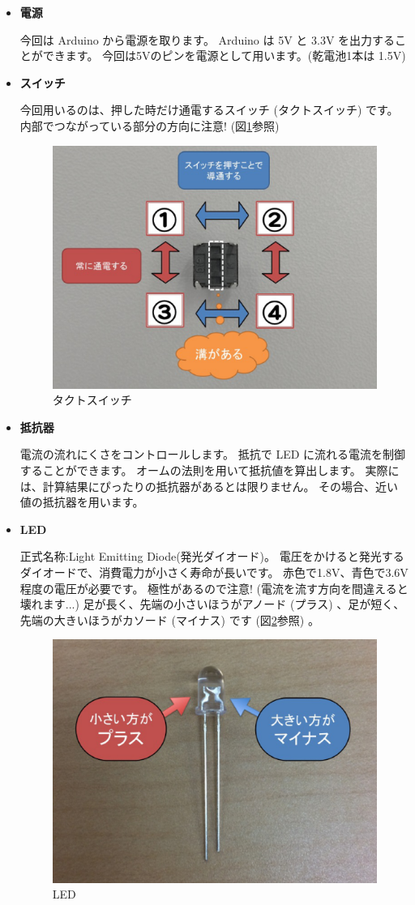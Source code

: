 \documentclass[11pt,a4paper]{jarticle}
\begin{document}
\begin{itemize}
 \item \textbf{電源}
       
       今回は Arduino から電源を取ります。
       Arduino は 5V と 3.3V を出力することができます。
       今回は5Vのピンを電源として用います。(乾電池1本は 1.5V)

 \item \textbf{スイッチ}

       今回用いるのは、押した時だけ通電するスイッチ (タクトスイッチ) です。
       内部でつながっている部分の方向に注意! (図\ref{figure:tact_switch}参照) 
       
\begin{figure}[htb]
 \centering
  \includegraphics[width=0.55\columnwidth]{img/tact_switch.eps}
  \caption{タクトスイッチ}
  \label{figure:tact_switch}
\end{figure}

 \item \textbf{抵抗器}

       電流の流れにくさをコントロールします。
       抵抗で LED に流れる電流を制御することができます。
       オームの法則を用いて抵抗値を算出します。
       実際には、計算結果にぴったりの抵抗器があるとは限りません。
       その場合、近い値の抵抗器を用います。

 \item \textbf{LED}

       正式名称:Light Emitting Diode(発光ダイオード)。
       電圧をかけると発光するダイオードで、消費電力が小さく寿命が長いです。
       赤色で1.8V、青色で3.6V程度の電圧が必要です。
       極性があるので注意! (電流を流す方向を間違えると壊れます...)
       足が長く、先端の小さいほうがアノード (プラス) 、足が短く、先端の大きいほうがカソード (マイナス) です (図\ref{figure:LED}参照) 。
       
\begin{figure}[htb]
  \centering
  \includegraphics[width=0.55\columnwidth]{img/LED.eps}
  \caption{LED}
  \label{figure:LED}
\end{figure}
       

\end{itemize}
\end{document}
